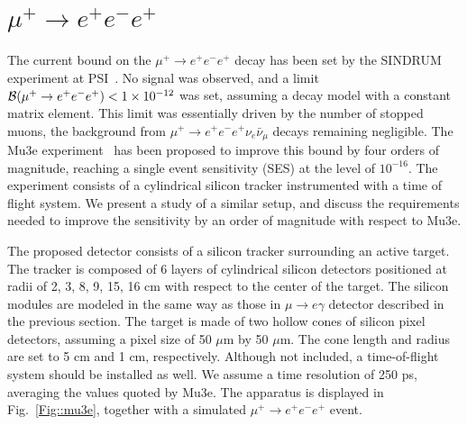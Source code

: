 \section{$\mu^+\to e^+e^-e^+$}
\label{mutoeee}

The current bound on the $\mu^+\to e^+e^-e^+$ decay has been set by the SINDRUM experiment at PSI~\cite{Bellgardt:1987du}. No signal was observed, and a limit ${\cal B}(\mu^+\to e^+e^-e^+) < 1\times 10^{-12}$ was set, assuming a decay model with a constant matrix element. This limit was essentially driven by the number of stopped muons, the background from $\mu^+\to e^+e^-e^+ \nu_e \bar\nu_\mu$ decays remaining negligible. 
The Mu3e experiment~\cite{Blondel:2013ia} has been proposed to improve this bound by four orders of magnitude, reaching a single event sensitivity (SES) at the level of $10^{-16}$. The experiment consists of a cylindrical silicon tracker instrumented with a time of flight system. We present a study of a similar setup, and discuss the requirements needed to improve the sensitivity by an order of magnitude with respect to Mu3e.
 
The proposed detector consists of a silicon tracker surrounding an active target. The tracker is composed of 6 layers of cylindrical silicon detectors positioned at radii of 2, 3, 8, 9, 15, 16 cm with respect to the center of the target. 
The silicon modules are modeled in the same way as those in $\mu\to e\gamma$
detector described in the previous section.
The target is made of two hollow cones of silicon pixel detectors, assuming a pixel size of 50 $\mu$m by 50 $\mu$m. The cone length and radius are set to 5 cm and 1 cm, respectively. Although not included, a time-of-flight system should be installed as well. We assume a time resolution of 250 ps, averaging the values quoted by Mu3e. The apparatus is displayed in Fig.~\ref{Fig::mu3e}, together with a simulated $\mu^+ \rightarrow e^+e^-e^+$ event.

